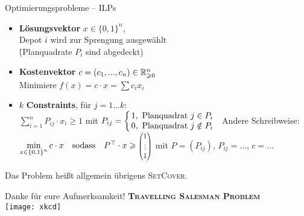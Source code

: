 \begin{frame}{Optimierungsprobleme – ILPs}
	\solutionheading
	\begin{itemize}
		\item \textbf{Lösungsvektor} $x \in \{0, 1\}^n$, \\ 
		Depot $i$ wird zur Sprengung ausgewählt  \\
		\. (\entspr Planquadrate $P_i$ sind abgedeckt)
		\item \textbf{Kostenvektor} $c = (c_1, ..., c_n) \in \mathbb{R}_{\geqslant0}^n$ \\
		\quad Minimiere $f(x) = c \cdot x = \sum c_i x_i$
		\item $k$ \textbf{Constraints}, \quad für $j = 1...k$: \\
		\quad $\sum\limits_{i=1}^{n} P_{ij} \cdot x_i  \geq 1$ \quad mit $P_{ij} = \casesl{1, \ \text{Planquadrat } j \in P_i \\ 0, \ \text{Planquadrat } j \notin P_i}$
		\implitem Andere Schreibweise: \\
			$\min\limits_{x \in \set{0,1}^n} c \* x \quad \text{sodass} \quad P^\top \* x \geq \scalebox{.7}{$\large \Matrix{1 \\ \vdots \\ 1}$}$\!\! \quad\! mit $P = (P_{ij})$, $P_{ij} = ...$, $c = ...$ 
	\end{itemize}
	Das Problem heißt allgemein übrigens \textsc{SetCover}.
\end{frame}

\begin{frame}{Danke für eure Aufmerksamkeit! \smiley}
	\centering
	\textbf{\textsc{Travelling Salesman Problem}} \\[.2\baselineskip]
	\texttt{[image: xkcd]}
\end{frame}


